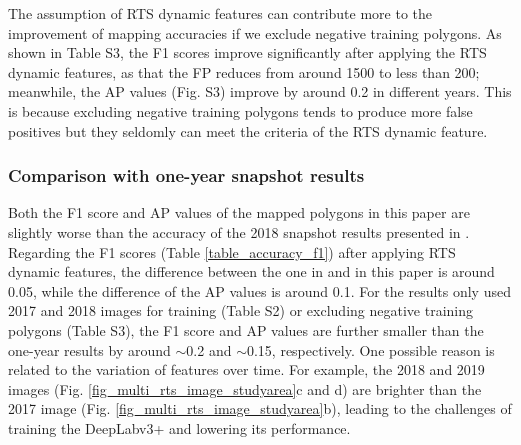 \documentclass[authoryear,preprint,review,12pt]{elsarticle}
\begin{document}
The assumption of RTS dynamic features can contribute more to the improvement of mapping accuracies if we exclude negative training polygons. %
As shown in Table S3, the F1 scores improve significantly after applying the RTS dynamic features, as that the FP reduces from around 1500 to less than 200; meanwhile, the AP values (Fig. S3) improve by around 0.2 in different years. 
This is because excluding negative training polygons tends to produce more false positives but they seldomly can meet the criteria of the RTS dynamic feature.  



\subsubsection{Comparison with one-year snapshot results}
\label{sec_compare_with_201805_results}

Both the F1 score and AP values of the mapped polygons in this paper are slightly worse than the accuracy of the 2018 snapshot results presented in \cite{huang2020using}. 
Regarding the F1 scores (Table \ref{table_accuracy_f1}) after applying RTS dynamic features, the difference between the one in \cite{huang2020using} and in this paper is around 0.05, while the difference of the AP values is around 0.1.
For the results only used 2017 and 2018 images for training (Table S2) or excluding negative training polygons (Table S3), the F1 score and AP values are further smaller than the one-year results by around $\sim$0.2 and $\sim$0.15, respectively. 
One possible reason is related to the variation of features over time. 
For example, the 2018 and 2019 images (Fig. \ref{fig_multi_rts_image_studyarea}c and d) are brighter than the 2017 image (Fig. \ref{fig_multi_rts_image_studyarea}b), leading to the challenges of training the DeepLabv3+ and lowering its performance. %

\end{document}
